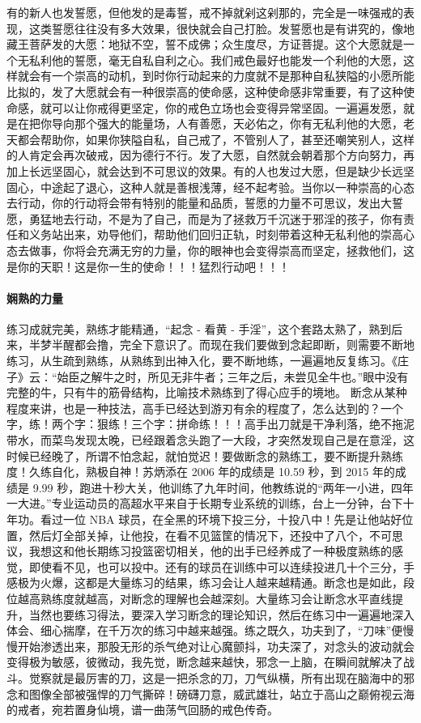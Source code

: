 有的新人也发誓愿，但他发的是毒誓，戒不掉就剁这剁那的，完全是一味强戒的表现，这类誓愿往往没有多大效果，很快就会自己打脸。发誓愿也是有讲究的，像地藏王菩萨发的大愿：地狱不空，誓不成佛；众生度尽，方证菩提。这个大愿就是一个无私利他的誓愿，毫无自私自利之心。我们戒色最好也能发一个利他的大愿，这样就会有一个崇高的动机，到时你行动起来的力度就不是那种自私狭隘的小愿所能比拟的，发了大愿就会有一种很崇高的使命感，这种使命感非常重要，有了这种使命感，就可以让你戒得更坚定，你的戒色立场也会变得异常坚固。一遍遍发愿，就是在把你导向那个强大的能量场，人有善愿，天必佑之，你有无私利他的大愿，老天都会帮助你，如果你狭隘自私，自己戒了，不管别人了，甚至还嘲笑别人，这样的人肯定会再次破戒，因为德行不行。发了大愿，自然就会朝着那个方向努力，再加上长远坚固心，就会达到不可思议的效果。有的人也发过大愿，但是缺少长远坚固心，中途起了退心，这种人就是善根浅薄，经不起考验。当你以一种崇高的心态去行动，你的行动将会带有特别的能量和品质，誓愿的力量不可思议，发出大誓愿，勇猛地去行动，不是为了自己，而是为了拯救万千沉迷于邪淫的孩子，你有责任和义务站出来，劝导他们，帮助他们回归正轨，时刻带着这种无私利他的崇高心态去做事，你将会充满无穷的力量，你的眼神也会变得崇高而坚定，拯救他们，这是你的天职！这是你一生的使命！！！猛烈行动吧！！！

\paragraph{娴熟的力量}

练习成就完美，熟练才能精通，“起念 - 看黄 - 手淫”，这个套路太熟了，熟到后来，半梦半醒都会撸，完全下意识了。而现在我们要做到念起即断，则需要不断地练习，从生疏到熟练，从熟练到出神入化，要不断地练，一遍遍地反复练习。《庄子》云：“始臣之解牛之时，所见无非牛者；三年之后，未尝见全牛也。”眼中没有完整的牛，只有牛的筋骨结构，比喻技术熟练到了得心应手的境地。 断念从某种程度来讲，也是一种技法，高手已经达到游刃有余的程度了，怎么达到的？一个字，练！两个字：狠练！三个字：拼命练！！！高手出刀就是干净利落，绝不拖泥带水，而菜鸟发现太晚，已经跟着念头跑了一大段，才突然发现自己是在意淫，这时候已经晚了，所谓不怕念起，就怕觉迟！要做断念的熟练工，要不断提升熟练度！久练自化，熟极自神！苏炳添在 2006 年的成绩是 10.59 秒，到 2015 年的成绩是 9.99 秒，跑进十秒大关，他训练了九年时间，他教练说的“两年一小进，四年一大进。”专业运动员的高超水平来自于长期专业系统的训练，台上一分钟，台下十年功。看过一位 NBA 球员，在全黑的环境下投三分，十投八中！先是让他站好位置，然后灯全部关掉，让他投，在看不见篮筐的情况下，还投中了八个，不可思议，我想这和他长期练习投篮密切相关，他的出手已经养成了一种极度熟练的感觉，即使看不见，也可以投中。还有的球员在训练中可以连续投进几十个三分，手感极为火爆，这都是大量练习的结果，练习会让人越来越精通。断念也是如此，段位越高熟练度就越高，对断念的理解也会越深刻。大量练习会让断念水平直线提升，当然也要练习得法，要深入学习断念的理论知识，然后在练习中一遍遍地深入体会、细心揣摩，在千万次的练习中越来越强。练之既久，功夫到了，“刀味”便慢慢开始渗透出来，那股无形的杀气绝对让心魔颤抖，功夫深了，对念头的波动就会变得极为敏感，彼微动，我先觉，断念越来越快，邪念一上脑，在瞬间就解决了战斗。觉察就是最厉害的刀，这是一把杀念的刀，刀气纵横，所有出现在脑海中的邪念和图像全部被强悍的刀气撕碎！磅礴刀意，威武雄壮，站立于高山之巅俯视云海的戒者，宛若置身仙境，谱一曲荡气回肠的戒色传奇。


